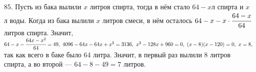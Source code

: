 85. Пусть из бака вылили $x$ литров спирта, тогда в нём стало $64-x$л спирта и $x$л воды. Когда из бака вылили $x$ литров смеси, в нём осталось $64-x-x\cdot \cfrac{64-x}{64}$ литров спирта. Значит, $64-x-\cfrac{64x-x^2}{64}=49,\
4096-64x-64x+x^2=3136,\ x^2-128x+960=0,\ (x-8)(x-120)=0,\ x=8,$ так как всего в баке было 64 литра. Значит, в первый раз вылили 8 литров спирта, а во второй --- $64-8-49=7$ литров.\\
